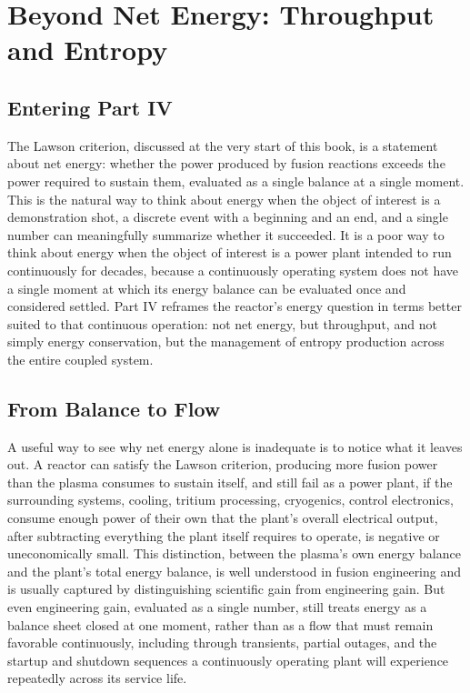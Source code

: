 \chapter{Beyond Net Energy: Throughput and Entropy}

\section{Entering Part IV}

The Lawson criterion, discussed at the very start of this book, is a statement about net energy: whether the power produced by fusion reactions exceeds the power required to sustain them, evaluated as a single balance at a single moment. This is the natural way to think about energy when the object of interest is a demonstration shot, a discrete event with a beginning and an end, and a single number can meaningfully summarize whether it succeeded. It is a poor way to think about energy when the object of interest is a power plant intended to run continuously for decades, because a continuously operating system does not have a single moment at which its energy balance can be evaluated once and considered settled. Part IV reframes the reactor's energy question in terms better suited to that continuous operation: not net energy, but throughput, and not simply energy conservation, but the management of entropy production across the entire coupled system.

\section{From Balance to Flow}

A useful way to see why net energy alone is inadequate is to notice what it leaves out. A reactor can satisfy the Lawson criterion, producing more fusion power than the plasma consumes to sustain itself, and still fail as a power plant, if the surrounding systems, cooling, tritium processing, cryogenics, control electronics, consume enough power of their own that the plant's overall electrical output, after subtracting everything the plant itself requires to operate, is negative or uneconomically small. This distinction, between the plasma's own energy balance and the plant's total energy balance, is well understood in fusion engineering and is usually captured by distinguishing scientific gain from engineering gain. But even engineering gain, evaluated as a single number, still treats energy as a balance sheet closed at one moment, rather than as a flow that must remain favorable continuously, including through transients, partial outages, and the startup and shutdown sequences a continuously operating plant will experience repeatedly across its service life.

